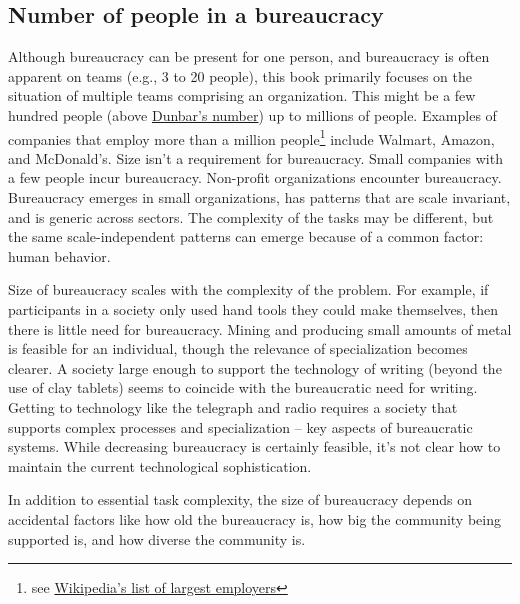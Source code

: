\subsection{Number of people in a bureaucracy}

Although bureaucracy can be present for one person, and bureaucracy is often apparent on teams (e.g., 3 to 20 people), this book primarily focuses on the situation of multiple teams comprising an organization. This might be a few hundred people (above \href{https://en.wikipedia.org/wiki/Dunbar's_number}{Dunbar's number}) up to millions of people. 
Examples of companies that employ more than a million people\footnote{see \href{https://en.wikipedia.org/wiki/List_of_largest_employers}{Wikipedia's list of largest employers}} include Walmart, Amazon, and McDonald's. Size isn't a requirement for bureaucracy. Small companies with a few people incur bureaucracy. Non-profit organizations encounter bureaucracy. 
Bureaucracy emerges in small organizations, has patterns that are scale invariant, and is generic across sectors. The complexity of the tasks may be different, but the same scale-independent patterns can emerge because of a common factor: human behavior.

Size of bureaucracy scales with the complexity of the problem. For example, if participants in a society only used hand tools they could make themselves, then there is little need for bureaucracy. Mining and producing small amounts of metal is feasible for an individual, though the relevance of specialization becomes clearer. A society large enough to support the technology of writing (beyond the use of clay tablets) seems to coincide with the bureaucratic need for writing. Getting to technology like the telegraph and radio requires a society that supports complex processes and specialization -- key aspects of bureaucratic systems. While decreasing bureaucracy is certainly feasible, it's not clear how to maintain the current technological sophistication. 


In addition to essential task complexity, the size of bureaucracy depends on accidental factors like how old the bureaucracy is, how big the community being supported is, and how diverse the community is.


